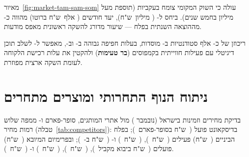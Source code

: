 מאיור~\ref{fig:market-tam-sam-som} עולה כי השוק המקומי צומח בעקביות (תוספת מעל
 מיליון בחמש שנים). ביחס ל- ( מיליון~ש"ח), יעד
חודשים  ( אלף~ש"ח ברוטו) מהווה כ- מההוצאה
השנתית בפלח --- שיעור מדורג להשקה ראשונית מאפס מודעות.

\begin{insightbox}
ריכוזן של כ- אלף סטודנטיות ב- מוסדות, בעלות חפיפה גבוהה
ב- וב-, מאפשר ל- לשלב תוכן דיגיטלי עם פעילות
חווייתית בקמפוסים (\textbf{בר טעימות}) ולהקטין את עלות רכישת הלקוחה לעומת
השקה ארצית מפוזרת.
\end{insightbox}

\section{ניתוח הנוף התחרותי ומוצרים מתחרים}
\label{sec:market-competitors}

בדיקת מחירים וזמינות בישראל (נובמבר ) מול אתרי המותגים, סופר-פארם
ו- ממפה שלוש רמות מחיר (טבלה~\ref{tab:competitors}): בדיסקאונט
פועל  (~ש"ח בסופר-פארם~\cite{essence2026superpharm});
בפלח הביניים (~ש"ח) פעילים  (~ש"ח~\cite{nyx2026superpharm}),
 (~ש"ח~\cite{maybelline2026superpharm})
ו- (~ש"ח ב-~\cite{clinique2026terminalx});
ובפרימיום המיובא (~ש"ח) פועלים  (~ש"ח ביבוא
מקביל~\cite{rhode2026tint,rhode2026terms,makeupstore2026rhode}), 
(~ש"ח~\cite{rarebeauty2026lipoil,makeupstore2026rare}), 
(~ש"ח~\cite{fenty2026poutsicle,fenty2026shipping}) ו-
(~ש"ח~\cite{benefit2026benetint,caretobeauty2026benefit}).

